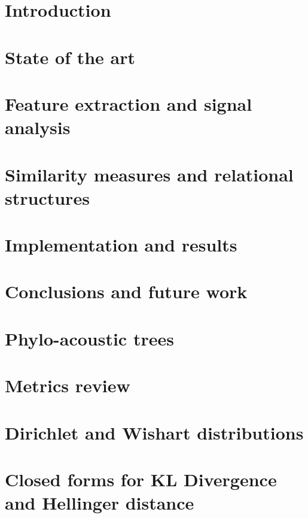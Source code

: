 \documentclass[pdftex,12pt,a4paper]{report}
\theoremstyle{definition}
\theoremstyle{remark}
\begin{document}
\tableofcontents
\newpage
\chapter{Introduction}

 
\chapter{State of the art}



\chapter{Feature extraction and signal analysis}
 

 
\chapter{Similarity measures and relational structures}



\chapter{Implementation and results}



\chapter{Conclusions and future work}







\appendix
\chapter{Phylo-acoustic trees}


\chapter{Metrics review}



\chapter{Dirichlet and Wishart distributions}



\chapter{Closed forms for KL Divergence and Hellinger distance}


\end{document}
